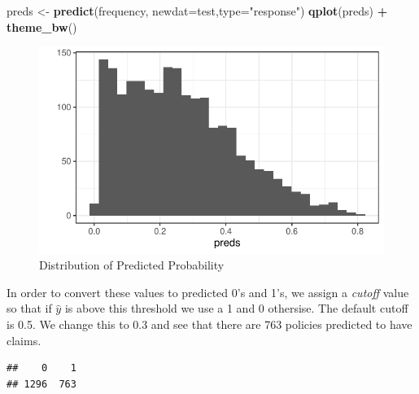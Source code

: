 \documentclass[]{book}
\newenvironment{Shaded}{\begin{snugshade}}{\end{snugshade}}
\newcommand{\DataTypeTok}[1]{\textcolor[rgb]{0.13,0.29,0.53}{#1}}
\newcommand{\DecValTok}[1]{\textcolor[rgb]{0.00,0.00,0.81}{#1}}
\newcommand{\KeywordTok}[1]{\textcolor[rgb]{0.13,0.29,0.53}{\textbf{#1}}}
\newcommand{\NormalTok}[1]{#1}
\newcommand{\OperatorTok}[1]{\textcolor[rgb]{0.81,0.36,0.00}{\textbf{#1}}}
\newcommand{\StringTok}[1]{\textcolor[rgb]{0.31,0.60,0.02}{#1}}
\begin{document}
\begin{Shaded}
\begin{Highlighting}[]
\NormalTok{preds <-}\StringTok{ }\KeywordTok{predict}\NormalTok{(frequency, }\DataTypeTok{newdat=}\NormalTok{test,}\DataTypeTok{type=}\StringTok{"response"}\NormalTok{)}
\KeywordTok{qplot}\NormalTok{(preds) }\OperatorTok{+}\StringTok{ }\KeywordTok{theme_bw}\NormalTok{()}
\end{Highlighting}
\end{Shaded}

\begin{figure}
\centering
\includegraphics{Exam-PA-Study-Manual_files/figure-latex/unnamed-chunk-104-1.pdf}
\caption{\label{fig:unnamed-chunk-104}Distribution of Predicted Probability}
\end{figure}

In order to convert these values to predicted 0's and 1's, we assign a \emph{cutoff} value so that if \(\hat{y}\) is above this threshold we use a 1 and 0 othersise. The default cutoff is 0.5. We change this to 0.3 and see that there are 763 policies predicted to have claims.

\begin{Shaded}
\end{Shaded}

\begin{verbatim}
##    0    1 
## 1296  763
\end{verbatim}
\end{document}
